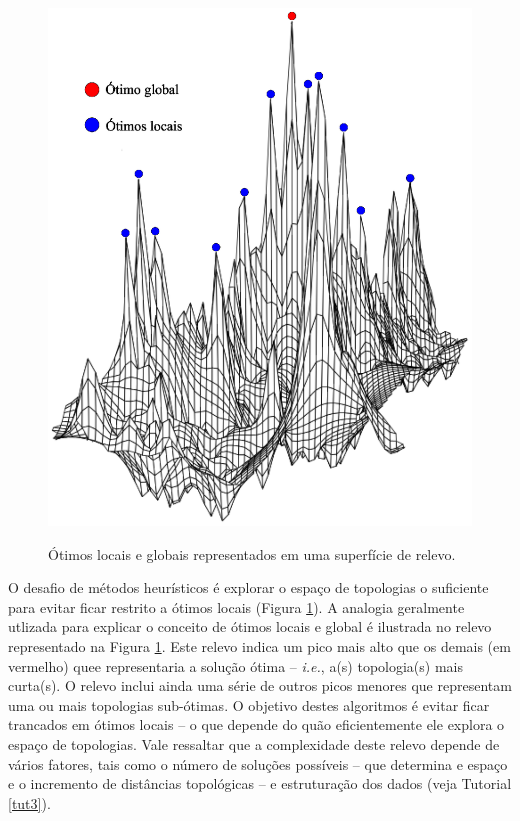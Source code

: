 \begin{refsection}
  \begin{figure}[H]
      {\includegraphics[scale=0.70]{figures/tut4/landscape.eps}}
      {\caption[\textit{\textit{Ótimos locais e globais} }]{Ótimos locais e globais representados em uma superfície de relevo.}\label{tut4:fig:landscape}}
  \end{figure}




O desafio de métodos heurísticos é explorar o espaço de topologias o suficiente para evitar ficar restrito a ótimos locais (Figura \ref{tut4:fig:landscape}). A analogia geralmente utlizada para explicar o conceito de ótimos locais e global é ilustrada no relevo representado na Figura \ref{tut4:fig:landscape}. Este relevo indica um pico mais alto que os demais (em vermelho) quee representaria a solução ótima -- \textit{i.e.}, a(s) topologia(s) mais curta(s). O relevo inclui ainda uma série de outros picos menores que representam uma ou mais topologias sub-ótimas. O objetivo destes algoritmos é evitar ficar trancados em ótimos locais -- o que depende do quão eficientemente ele explora o espaço de topologias. Vale ressaltar que a complexidade deste relevo depende de vários fatores, tais como o número de soluções possíveis -- que determina e espaço e o incremento de distâncias topológicas -- e estruturação dos dados (veja Tutorial \ref{tut3}).


\end{refsection}
